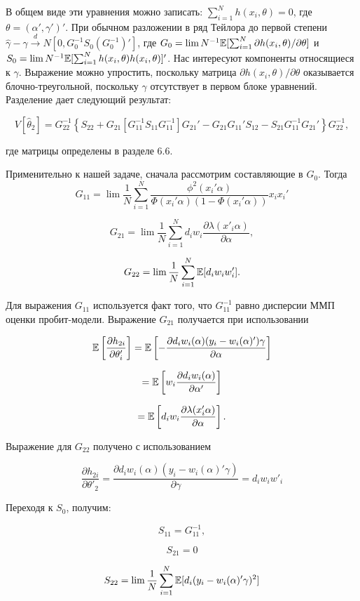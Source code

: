 В общем виде эти уравнения можно записать: $\sum_{i=1}^Nh(x_i,\theta)=0$, где $\theta=(\alpha',\gamma')'$. При обычном разложении в ряд Тейлора до первой степени $\hat{\gamma}-\gamma\overset{d}{\to} N[0,G^{-1}_0S_0(G^{-1}_0)']$, где $G_0=\lim N^{-1}\mathbb{E}[\sum_{i=1}^N\partial h(x_i,\theta)/\partial\theta]$ и $S_0=\lim N^{-1}\mathbb{E}[\sum_{i=1}^N  h(x_i,\theta)h(x_i,\theta)]'$. Нас интересуют компоненты относящиеся к $\gamma$. Выражение можно упростить, поскольку матрица $\partial h(x_i,\theta)/\partial\theta$ оказывается блочно-треугольной, поскольку $\gamma$ отсутствует в первом блоке уравнений. Разделение дает следующий результат:

\[
V[\hat{\theta}_2]=
G_22^{-1}\left\lbrace S_22+G_21[G_11^{-1}S_11G_11^{-1}]G_21'-G_{21}G_{11}'S_{12}-S_{21}G_{11}^{-1}G_{21}'\right\rbrace{G_{22}^{-1}},
\]

где матрицы определены в разделе 6.6.

Применительно к нашей задаче, сначала рассмотрим составляющие в  $G_0$. Тогда
\[
G_{11}=\lim\dfrac{1}{N}\sum_{i=1}^N \dfrac{\phi^2(x_i'\alpha)}{\Phi(x_i'\alpha)(1-\Phi(x_i'\alpha))}x_ix_i'
\]

\[
G_{21}=\lim\dfrac{1}{N}\sum_{i=1}^N d_iw_i\dfrac{\partial\lambda(x'_{i}\alpha)}{\partial\alpha},
\]

\[
G_{22}=\lim\dfrac{1}{N}\sum_{i=1}^N \mathbb{E}[d_{i}w_iw'_i].
\]

Для выражения $G_11$ используется факт того, что $G^{-1}_{11}$ равно дисперсии ММП оценки пробит-модели. Выражение $G_{21}$ получается при использовании 

\[
\mathbb{E}\left[\dfrac{{\partial}h_{2i}}{\partial\theta'_{i}}\right]=\mathbb{E} \left[-\dfrac{\partial d_{i}w_{i}(\alpha)(y_{i}-w_{i}(\alpha)')\gamma}{\partial{\alpha}}\right]
\]

\[
=\mathbb{E}\left[w_{i}\dfrac{{\partial}d_{i}w_{i}(\alpha)}{\partial\alpha'}\right]
\]

\[
=\mathbb{E}\left[d_{i}w_{i}\dfrac{\partial\lambda(x'_{i}\alpha)}{\partial\alpha}\right].
\]

Выражение для $G_{22}$ получено с использованием

\[
\dfrac{\partial h_{2i}}{\partial\theta'_{2}}=\dfrac{{\partial}d_{i}w_{i}(\alpha)(y_i - w_{i}(\alpha)'\gamma)}{\partial\gamma}=d_{i}w_{i}w'_i
\]

Переходя к $S_0$, получим:

\[
S_{11}=G^{-1}_{11},
\]

\[
S_{21}=0
\]

\[
S_{22}=\lim\dfrac{1}{N}\sum^{N}_{i=1}\mathbb{E}[d_{i}(y_i - w_{i}(\alpha)'\gamma)^2]
\]

